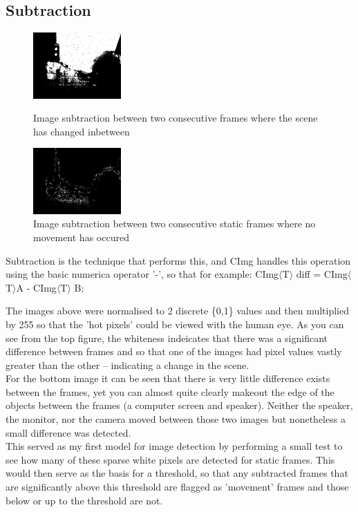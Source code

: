 \documentclass[11pt]{article} %
\begin{document}
\subsection{Subtraction}
\begin{figure}
	\vspace{-40pt}
	\begin{center}
		\includegraphics[width=0.3\textwidth]{../images/subG}
	\end{center}
	\vspace{-20pt}
	\caption{Image subtraction between two consecutive frames where the scene has changed inbetween}
	\vspace{10pt}
	\begin{center}
		\includegraphics[width=0.3\textwidth]{../images/subF}
	\end{center}
	\vspace{-20pt}
	\caption{Image subtraction between two consecutive static frames where no movement has occured}
\end{figure}
Subtraction is the technique that performs this, and CImg handles this operation using the basic numerica operator '-', so that for example: CImg\(\langle\)T\(\rangle\) diff = CImg\(\langle\)T\(\rangle\)A - CImg\(\langle\)T\(\rangle\) B;

The images above were normalised to 2 discrete \{0,1\} values and then multiplied by 255 so that the 'hot pixels' could be viewed with the human eye. As you can see from the top figure, the whiteness indeicates that there was a significant difference between frames and so that one of the images had pixel values vastly greater than the other -- indicating a change in the scene.
\\For the bottom image it can be seen that there is very little difference exists between the frames, yet you can almost quite clearly makeout the edge of the objects between the frames (a computer screen and speaker). Neither the speaker, the monitor, nor the camera moved between those two images but nonetheless a small difference was detected.\\
This served as my first model for image detection by performing a small test to see how many of these sparse white pixels are detected for static frames. This would then serve as the basis for a threshold, so that any subtracted frames that are significantly above this threshold are flagged as 'movement' frames and those below or up to the threshold 
are not.
\pagebreak
\end{document}
